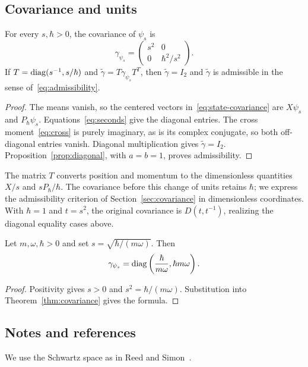\subsection{Covariance and units}
\begin{theorem}\label{thm:covariance}
For every $s,\hbar>0$, the covariance of $\psi_s$ is
\[
 \gamma_{\psi_s}=\begin{pmatrix}s^2&0\\0&\hbar^2/s^2\end{pmatrix}.
\]
If $T=\operatorname{diag}(s^{-1},s/\hbar)$ and
$\widetilde\gamma=T\gamma_{\psi_s}T^T$, then $\widetilde\gamma=I_2$
and $\widetilde\gamma$ is admissible in the sense
of~\eqref{eq:admissibility}.
\end{theorem}
\begin{proof}
The means vanish, so the centered vectors in~\eqref{eq:state-covariance}
are $X\psi_s$ and $P_\hbar\psi_s$. Equations~\eqref{eq:seconds}
give the diagonal entries. The cross moment~\eqref{eq:cross} is purely
imaginary, as is its complex conjugate, so both off-diagonal entries vanish.
Diagonal multiplication gives $\widetilde\gamma=I_2$.
Proposition~\ref{prop:diagonal}, with $a=b=1$, proves admissibility.
\end{proof}

The matrix $T$ converts position and momentum to the dimensionless quantities
$X/s$ and $sP_\hbar/\hbar$. The covariance before this change of units retains
$\hbar$; we express the admissibility criterion of Section~\ref{sec:covariance}
in dimensionless coordinates. With $\hbar=1$ and $t=s^2$, the original covariance is
$D(t,t^{-1})$, realizing the diagonal equality cases above.

\begin{corollary}\label{cor:physical}
Let $m,\omega,\hbar>0$ and set $s=\sqrt{\hbar/(m\omega)}$. Then
\[
 \gamma_{\psi_s}=\operatorname{diag}\left(\frac{\hbar}{m\omega},\hbar m\omega\right).
\]
\end{corollary}
\begin{proof}
Positivity gives $s>0$ and $s^2=\hbar/(m\omega)$. Substitution into
Theorem~\ref{thm:covariance} gives the formula.
\end{proof}

\begin{vetxenv}
\subsection*{Notes and references}
We use the Schwartz space as in Reed and Simon~\cite[Sec.~V.3]{rs1}. 
\end{vetxenv}
